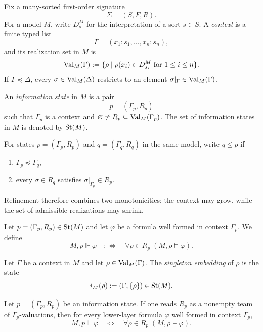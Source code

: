Fix a many-sorted first-order signature
\[
\Sigma=(S,F,R).
\]
For a model $M$, write $D_s^M$ for the interpretation of a sort $s\in S$. A \emph{context} is a finite typed list
\[
\Gamma=(x_1:s_1,\dots,x_n:s_n),
\]
and its realization set in $M$ is
\[
\mathrm{Val}_M(\Gamma):=\{\rho\mid \rho(x_i)\in D_{s_i}^M\text{ for }1\le i\le n\}.
\]
If $\Gamma\preceq\Delta$, every $\sigma\in\mathrm{Val}_M(\Delta)$ restricts to an element $\sigma|_{\Gamma}\in\mathrm{Val}_M(\Gamma)$.

\begin{definition}\label{def:information-state}
An \emph{information state} in $M$ is a pair
\[
p=(\Gamma_p,R_p)
\]
such that $\Gamma_p$ is a context and $\varnothing\neq R_p\subseteq \mathrm{Val}_M(\Gamma_p)$. The set of information states in $M$ is denoted by $\mathrm{St}(M)$.
\end{definition}

\begin{definition}[Refinement]\label{def:refinement}
For states $p=(\Gamma_p,R_p)$ and $q=(\Gamma_q,R_q)$ in the same model, write $q\le p$ if
\begin{enumerate}[label=(\roman*),nosep]
\item $\Gamma_p\preceq\Gamma_q$,
\item every $\sigma\in R_q$ satisfies $\sigma|_{\Gamma_p}\in R_p$.
\end{enumerate}
\end{definition}

Refinement therefore combines two monotonicities: the context may grow, while the set of admissible realizations may shrink.

\begin{definition}\label{def:state-forcing}
Let $p=(\Gamma_p,R_p)\in\mathrm{St}(M)$ and let $\varphi$ be a formula well formed in context $\Gamma_p$. We define
\[
M,p\Vdash\varphi
\quad:\Longleftrightarrow\quad
\forall \rho\in R_p\;(M,\rho\models\varphi).
\]
\end{definition}

\begin{definition}\label{def:singleton-embedding}
Let $\Gamma$ be a context in $M$ and let $\rho\in \mathrm{Val}_M(\Gamma)$. The \emph{singleton embedding} of $\rho$ is the state
\[
i_M(\rho):=(\Gamma,\{\rho\})\in\mathrm{St}(M).
\]
\end{definition}

\begin{proposition}\label{prop:flat-team-reading}
Let $p=(\Gamma_p,R_p)$ be an information state. If one reads $R_p$ as a nonempty team of $\Gamma_p$-valuations, then for every lower-layer formula $\varphi$ well formed in context $\Gamma_p$,
\[
M,p\Vdash\varphi
\quad\Longleftrightarrow\quad
\forall \rho\in R_p\;(M,\rho\models\varphi).
\]
\end{proposition}

